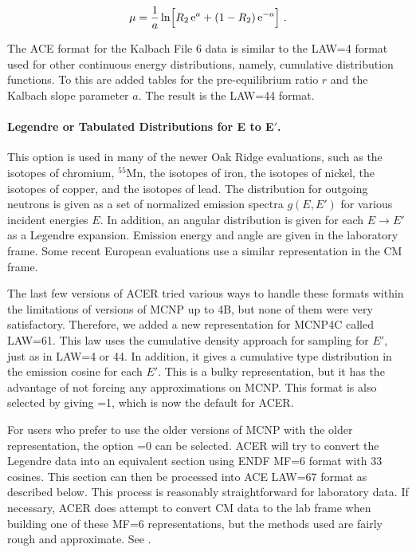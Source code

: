 \begin{equation}
   \mu=\frac{1}{a} \ln\Bigl[ R_2\,{\rm e}^a+(1-R_2)\,{\rm e}^{-a} \Bigr]\,\,.
\end{equation}
\vspace{0.5 pt}

The ACE format for the Kalbach File 6 data is similar to the
LAW=4 format used for other continuous energy distributions, namely,
cumulative distribution functions.  To this are added tables for the
pre-equilibrium ratio $r$ and the Kalbach slope parameter $a$.  The
result is the LAW=44 format.

\paragraph{Legendre or Tabulated Distributions for E to E$'$.}
This option is used in many of the newer Oak Ridge
evaluations, such as the isotopes of chromium, $^{55}$Mn,
the isotopes of iron, the isotopes of nickel, the isotopes of copper,
and the isotopes of lead.  The distribution for outgoing neutrons
is given as a set of normalized emission spectra $g(E,E')$ for
various incident energies $E$.  In addition, an angular distribution
is given for each $E{\rightarrow}E'$ as a Legendre expansion.
Emission energy and angle are given in the laboratory frame.
Some recent European evaluations use a similar representation
in the CM frame.

The last few versions of ACER tried various ways to handle these
formats within the limitations of versions of MCNP up to 4B, but
none of them were very satisfactory.  Therefore, we added a new
representation for MCNP4C called LAW=61.  This law uses the
cumulative density approach for sampling for $E'$, just as in
LAW=4 or 44.  In addition, it gives a cumulative type distribution
in the emission cosine for each $E'$.  This is a bulky representation,
but it has the advantage of not forcing any approximations on MCNP.
This format is also selected by giving =1, which
is now the default for ACER.

For users who prefer to use the older versions of MCNP with the
older representation, the option =0 can be selected.
ACER will try to convert the Legendre data into an equivalent
section using ENDF MF=6 format with 33 cosines.  This section can
then be processed into ACE LAW=67 format as described below.
This process is reasonably straightforward for laboratory data.
If necessary, ACER does attempt to convert CM data to the lab
frame when building one of these MF=6 representations, but the
methods used are fairly rough and approximate.  See .


